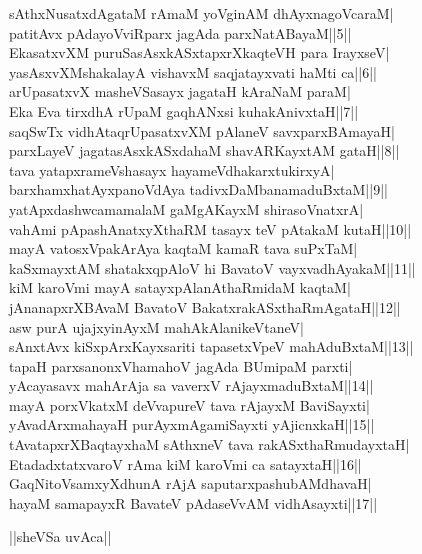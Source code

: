\documentclass{article}
\begin{document}
sAthxNusatxdAgataM rAmaM yoVginAM dhAyxnagoVcaraM|\\
patitAvx pAdayoVviRparx jagAda parxNatABayaM||5||\\
EkasatxvXM puruSasAsxkASxtapxrXkaqteVH para IrayxseV|\\
yasAsxvXMshakalayA vishavxM saqjatayxvati haMti ca||6||\\
arUpasatxvX masheVSasayx jagataH kAraNaM paraM|\\
Eka Eva tirxdhA rUpaM gaqhANxsi kuhakAnivxtaH||7||\\
saqSwTx vidhAtaqrUpasatxvXM pAlaneV savxparxBAmayaH|\\
parxLayeV jagatasAsxkASxdahaM shavARKayxtAM gataH||8||\\
tava yatapxrameVshasayx hayameVdhakarxtukirxyA|\\
barxhamxhatAyxpanoVdAya tadivxDaMbanamaduBxtaM||9||\\
yatApxdashwcamamalaM gaMgAKayxM shirasoVnatxrA|\\
vahAmi pApashAnatxyXthaRM tasayx teV pAtakaM kutaH||10||\\
mayA vatosxVpakArAya kaqtaM kamaR tava suPxTaM|\\
kaSxmayxtAM shatakxqpAloV hi BavatoV vayxvadhAyakaM||11||\\
kiM karoVmi mayA satayxpAlanAthaRmidaM kaqtaM|\\
jAnanapxrXBAvaM BavatoV BakatxrakASxthaRmAgataH||12||\\
asw purA ujajxyinAyxM mahAkAlanikeVtaneV|\\
sAnxtAvx kiSxpArxKayxsariti tapasetxVpeV mahAduBxtaM||13||\\
tapaH parxsanonxVhamahoV jagAda BUmipaM parxti|\\
yAcayasavx mahArAja sa vaverxV rAjayxmaduBxtaM||14||\\
mayA porxVkatxM deVvapureV tava rAjayxM BaviSayxti|\\
yAvadArxmahayaH purAyxmAgamiSayxti yAjicnxkaH||15||\\
tAvatapxrXBaqtayxhaM sAthxneV tava rakASxthaRmudayxtaH|\\
EtadadxtatxvaroV rAma kiM karoVmi ca satayxtaH||16||\\
GaqNitoVsamxyXdhunA rAjA saputarxpashubAMdhavaH|\\
hayaM samapayxR BavateV pAdaseVvAM vidhAsayxti||17||\\

\begin{center}
||sheVSa uvAca||
\end{center}
\end{document}
